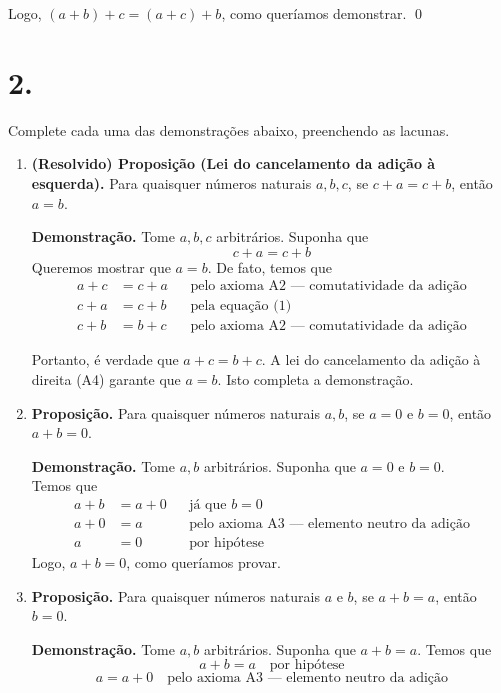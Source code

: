 \documentclass[12pt,a4paper]{article}
\begin{document}
\medskip

Logo, $(a + b) + c = (a + c) + b$, como queríamos demonstrar. \qed

\section*{2.}
Complete cada uma das demonstrações abaixo, preenchendo as lacunas.

\begin{enumerate}[label=(\alph*)]
    \item \textbf{(Resolvido) Proposição (Lei do cancelamento da adição à esquerda).} Para quaisquer números naturais $a, b, c$, se $c + a = c + b$, então $a = b$.

    \textbf{Demonstração.} Tome $a, b, c$ arbitrários. Suponha que
    \[
        c + a = c + b \tag{1}
    \]
    Queremos mostrar que $a = b$. De fato, temos que
    \begin{align*}
        a + c &= c + a && \text{pelo axioma A2 — comutatividade da adição} \\
        c + a &= c + b && \text{pela equação (1)} \\
        c + b &= b + c && \text{pelo axioma A2 — comutatividade da adição}
    \end{align*}

    Portanto, é verdade que $a + c = b + c$. A lei do cancelamento da adição à direita (A4) garante que $a = b$. Isto completa a demonstração.

    \item \textbf{Proposição.} Para quaisquer números naturais $a, b$, se $a = 0$ e $b = 0$, então $a + b = 0$.

    \textbf{Demonstração.} Tome $a, b$ arbitrários. Suponha que $a = 0$ e $b = 0$.\\
    Temos que
    \begin{align*}
        a + b &= a + 0 && \text{já que $b = 0$} \\
        a + 0 &= a && \text{pelo axioma A3 — elemento neutro da adição} \\
        a &= 0 && \text{por hipótese}
    \end{align*}
    Logo, $a + b = 0$, como queríamos provar.

    \item \textbf{Proposição.} Para quaisquer números naturais $a$ e $b$, se $a + b = a$, então $b = 0$.

    \textbf{Demonstração.} Tome $a, b$ arbitrários. Suponha que $a + b = a$. Temos que
    \[
    a + b = a \quad \text{por hipótese}
    \]
    \[
    a = a + 0 \quad \text{pelo axioma A3 — elemento neutro da adição}
    \]
    

\end{enumerate}
\end{document}
